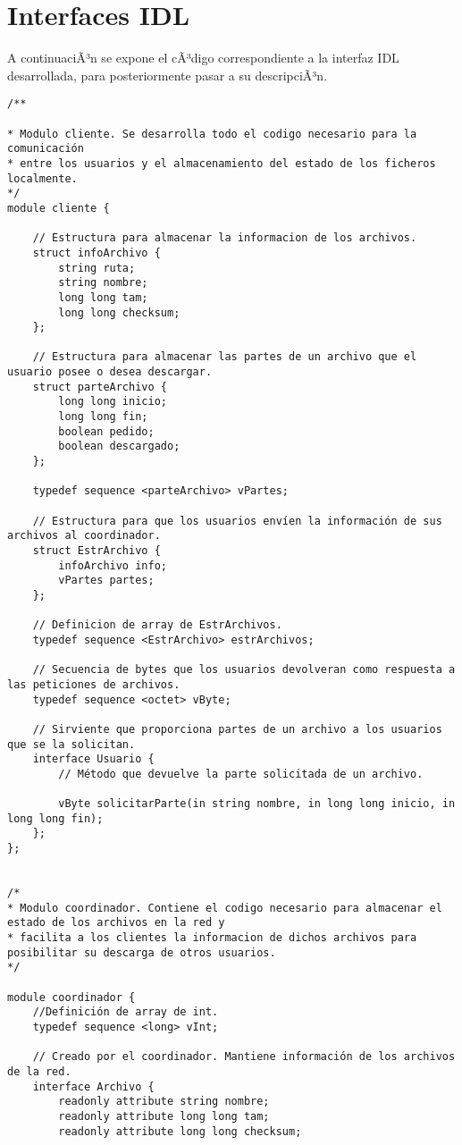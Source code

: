 \chapter{Interfaces IDL}
A continuaciÃ³n se expone el cÃ³digo correspondiente a la interfaz IDL desarrollada, para posteriormente pasar a su descripciÃ³n.\\

\begin{verbatim}
/**

* Modulo cliente. Se desarrolla todo el codigo necesario para la comunicación
* entre los usuarios y el almacenamiento del estado de los ficheros localmente.
*/
module cliente {

	// Estructura para almacenar la informacion de los archivos.
	struct infoArchivo {
		string ruta;
		string nombre;
		long long tam;
		long long checksum;
	};

	// Estructura para almacenar las partes de un archivo que el usuario posee o desea descargar.
	struct parteArchivo {
		long long inicio;
		long long fin;
		boolean pedido;
		boolean descargado;
	};

	typedef sequence <parteArchivo> vPartes;

	// Estructura para que los usuarios envíen la información de sus archivos al coordinador.
	struct EstrArchivo {
		infoArchivo info;
		vPartes partes;
	};

	// Definicion de array de EstrArchivos.
	typedef sequence <EstrArchivo> estrArchivos;

	// Secuencia de bytes que los usuarios devolveran como respuesta a las peticiones de archivos.
	typedef sequence <octet> vByte;

	// Sirviente que proporciona partes de un archivo a los usuarios que se la solicitan.
	interface Usuario {
		// Método que devuelve la parte solicitada de un archivo.

		vByte solicitarParte(in string nombre, in long long inicio, in long long fin);
	};
};


/*
* Modulo coordinador. Contiene el codigo necesario para almacenar el estado de los archivos en la red y
* facilita a los clientes la informacion de dichos archivos para posibilitar su descarga de otros usuarios.
*/

module coordinador {
	//Definición de array de int.
	typedef sequence <long> vInt;
	
	// Creado por el coordinador. Mantiene información de los archivos de la red.
	interface Archivo {
		readonly attribute string nombre;
		readonly attribute long long tam;
		readonly attribute long long checksum;


\end{verbatim}
